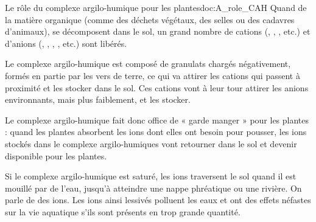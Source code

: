 \begin{doc}{Le rôle du complexe argilo-humique pour les plantes}{doc:A_role_CAH}
  Quand de la matière organique (comme des déchets végétaux, des selles ou des cadavres d'animaux), se décomposent dans le sol, un grand nombre de cations (\ionPotassium, \ionSodium, \ammonium, etc.) et d'anions (\ionPhosphate, \nitrate, \nitrite, \sulfate, etc.) sont libérés.

  Le complexe argilo-humique est composé de granulats chargés négativement, formés en partie par les vers de terre, ce qui va attirer les cations qui passent à proximité et les stocker dans le sol. 
  Ces cations vont à leur tour attirer les anions environnants, mais plus faiblement, et les stocker.

  \begin{importants}
    Le complexe argilo-humique fait donc office de « garde manger » pour les plantes : quand les plantes absorbent les ions dont elles ont besoin pour pousser, les ions stockés dans le complexe argilo-humiques vont retourner dans le sol et devenir disponible pour les plantes.
  \end{importants}

  Si le complexe argilo-humique est saturé, les ions traversent le sol quand il est mouillé par de l'eau, jusqu'à atteindre une nappe phréatique ou une rivière.
  On parle de  des ions.
  Les ions ainsi lessivés polluent les eaux et ont des effets néfastes sur la vie aquatique s'ils sont présents en trop grande quantité.
\end{doc}

